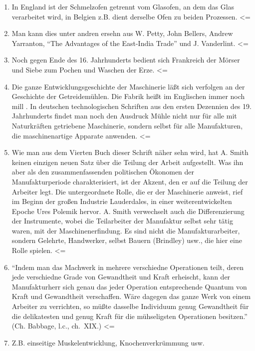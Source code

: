 {\begin{enumerate}
  1832, ch.~XXI, p.~172, 173.) \textless{}=
\item
  In England ist der Schmelzofen getrennt vom Glasofen, an dem das Glas
  verarbeitet wird, in Belgien z.B. dient derselbe Ofen zu beiden
  Prozessen. \textless{}=
\item
  Man kann dies unter andren ersehn aus W. Petty, John Bellers, Andrew
  Yarranton, ``The Advantages of the East-India Trade'' und J.
  Vanderlint. \textless{}=
\item
  Noch gegen Ende des 16. Jahrhunderts bedient sich Frankreich der
  Mörser und Siebe zum Pochen und Waschen der Erze. \textless{}=
\item
  Die ganze Entwicklungsgeschichte der Maschinerie läßt sich verfolgen
  an der Geschichte der Getreidemühlen. Die Fabrik heißt im Englischen
  immer noch mill . In deutschen technologischen Schriften aus den
  ersten Dezennien des 19. Jahrhunderts findet man noch den Ausdruck
  Mühle nicht nur für alle mit Naturkräften getriebene Maschinerie,
  sondern selbst für alle Manufakturen, die maschinenartige Apparate
  anwenden. \textless{}=
\item
  Wie man aus dem Vierten Buch dieser Schrift näher sehn wird, hat A.
  Smith keinen einzigen neuen Satz über die Teilung der Arbeit
  aufgestellt. Was ihn aber als den zusammenfassenden politischen
  Ökonomen der Manufakturperiode charakterisiert, ist der Akzent, den er
  auf die Teilung der Arbeiter legt. Die untergeordnete Rolle, die er
  der Maschinerie anweist, rief im Beginn der großen Industrie
  Lauderdales, in einer weiterentwickelten Epoche Ures Polemik hervor.
  A. Smith verwechselt auch die Differenzierung der Instrumente, wobei
  die Teilarbeiter der Manufaktur selbst sehr tätig waren, mit der
  Maschinenerfindung. Es sind nicht die Manufakturarbeiter, sondern
  Gelehrte, Handwerker, selbst Bauern (Brindley) usw., die hier eine
  Rolle spielen. \textless{}=
\item
  ``Indem man das Machwerk in mehrere verschiedne Operationen teilt,
  deren jede verschiedne Grade von Gewandtheit und Kraft erheischt, kann
  der Manufakturherr sich genau das jeder Operation entsprechende
  Quantum von Kraft und Gewandtheit verschaffen. Wäre dagegen das ganze
  Werk von einem Arbeiter zu verrichten, so müßte dasselbe Individuum
  genug Gewandtheit für die delikatesten und genug Kraft für die
  mühseligsten Operationen besitzen.'' (Ch. Babbage, l.c., ch.~XIX.)
  \textless{}=
\item
  Z.B. einseitige Muskelentwicklung, Knochenverkrümmung usw.

\end{enumerate}}
